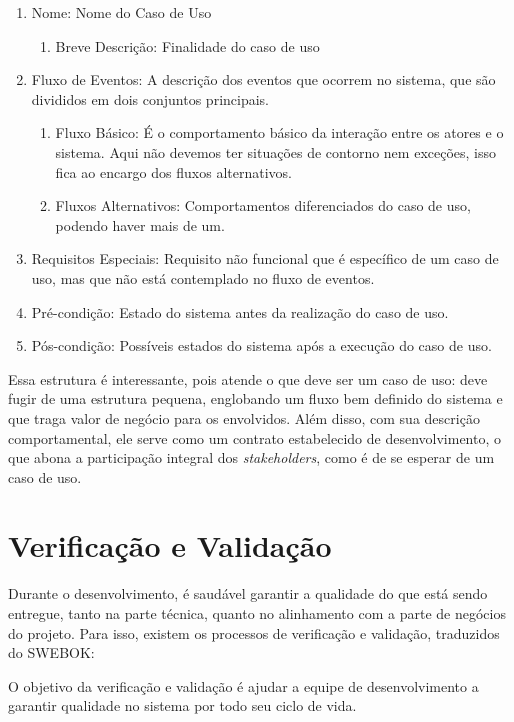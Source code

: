 \begin{enumerate}
    \item Nome: Nome do Caso de Uso
    \begin{enumerate}
        \item Breve Descrição: Finalidade do caso de uso
    \end{enumerate}
    \item Fluxo de Eventos: A descrição dos eventos que ocorrem no sistema, que são divididos em dois conjuntos principais.
    \begin{enumerate}
        \item Fluxo Básico: É o comportamento básico da interação entre os atores e o sistema. Aqui não devemos ter situações de contorno nem exceções, isso fica ao encargo dos fluxos alternativos.
        \item Fluxos Alternativos: Comportamentos diferenciados do caso de uso, podendo haver mais de um.
    \end{enumerate}
    \item Requisitos Especiais: Requisito não funcional que é específico de um caso de uso, mas que não está contemplado no fluxo de eventos.
    \item Pré-condição: Estado do sistema antes da realização do caso de uso.
    \item Pós-condição: Possíveis estados do sistema após a execução do caso de uso.
\end{enumerate}

Essa estrutura é interessante, pois atende o que deve ser um caso de uso: deve fugir de uma estrutura pequena, englobando um fluxo bem definido do sistema e que traga valor de negócio para os envolvidos. Além disso, com sua descrição comportamental, ele serve como um contrato estabelecido de desenvolvimento, o que abona a participação integral dos \textit{stakeholders}, como é de se esperar de um caso de uso.

\section{Verificação e Validação}

Durante o desenvolvimento, é saudável garantir a qualidade do que está sendo entregue, tanto na parte técnica, quanto no alinhamento com a parte de negócios do projeto. Para isso, existem os processos de verificação e validação, traduzidos do SWEBOK\cite{ieeecomputersociety2014}:

\begin{citacaoLonga}
O objetivo da verificação e validação é ajudar a equipe de desenvolvimento a garantir qualidade no sistema por todo seu ciclo de vida.
\end{citacaoLonga}

